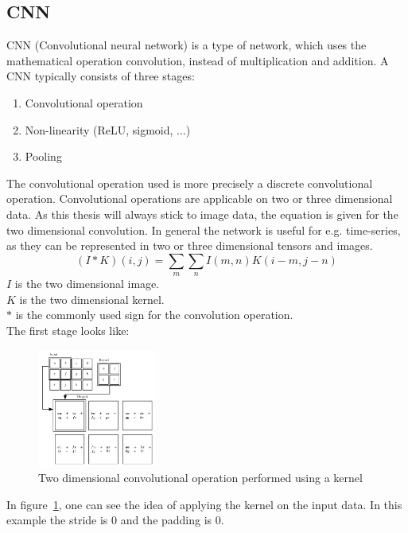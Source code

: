  \subsection{CNN} \label{subsection::cnn}
  CNN (Convolutional neural network) is a type of network, which uses the mathematical operation convolution, instead of multiplication and addition.
  A CNN typically consists of three stages:
  \begin{enumerate}
   \item Convolutional operation
   \item Non-linearity (ReLU, sigmoid, $\ldots$)
   \item Pooling
  \end{enumerate}
  The convolutional operation used is more precisely a discrete convolutional operation.
  Convolutional operations are applicable on two or three dimensional data. As this thesis will always stick to image data, the equation is given for the
  two dimensional convolution. In general the network is useful for e.g. time-series, as they can be represented in two or three dimensional tensors and images.
  \begin{equation}
   (I \ast K)(i, j) = \sum_m\sum_nI(m,n)K(i-m,j-n)
  \end{equation}
  $I$ is the two dimensional image.\\
  $K$ is the two dimensional kernel.\\
  $\ast$ is the commonly used sign for the convolution operation.\\
  The first stage looks like:
  \begin{figure}[H]
   \includegraphics[width=0.35\textwidth]{../Images/kernel.png}
   \centering
   \caption{Two dimensional convolutional operation performed using a kernel \cite{Goodfellow2016}}
   \label{fig:kernel}
  \end{figure}\noindent
  In figure~\ref{fig:kernel}, one can see the idea of applying the kernel on the input data. In this example the stride is $0$ and the padding is $0$.\\
